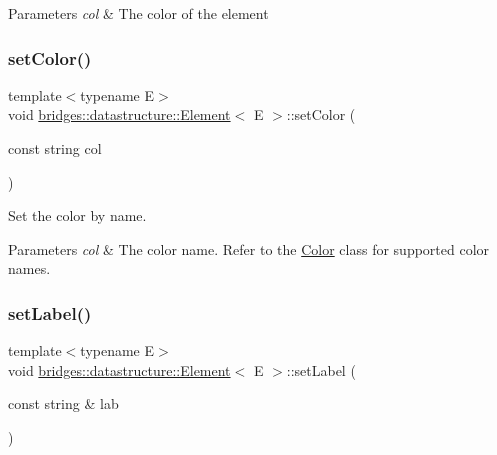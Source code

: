 \begin{DoxyParams}{Parameters}
{\em col} & The color of the element \\
\hline
\end{DoxyParams}
\mbox{\label{classbridges_1_1datastructure_1_1_element_a3792c8d514f4d644d739c6124f26bcbf}} 
\subsubsection{\texorpdfstring{set\+Color()}{setColor()}\hspace{0.1cm}{\footnotesize\ttfamily [2/2]}}
{\footnotesize\ttfamily template$<$typename E$>$ \\
void \hyperlink{classbridges_1_1datastructure_1_1_element}{bridges\+::datastructure\+::\+Element}$<$ E $>$\+::set\+Color (\begin{DoxyParamCaption}\item[{const string}]{col }\end{DoxyParamCaption})\hspace{0.3cm}{\ttfamily [inline]}}



Set the color by name. 


\begin{DoxyParams}{Parameters}
{\em col} & The color name. Refer to the \hyperlink{classbridges_1_1datastructure_1_1_color}{Color} class for supported color names. \\
\hline
\end{DoxyParams}
\mbox{\label{classbridges_1_1datastructure_1_1_element_a3a1fe4e3aa100125710c30f6e401e8c3}} 
\subsubsection{\texorpdfstring{set\+Label()}{setLabel()}}
{\footnotesize\ttfamily template$<$typename E$>$ \\
void \hyperlink{classbridges_1_1datastructure_1_1_element}{bridges\+::datastructure\+::\+Element}$<$ E $>$\+::set\+Label (\begin{DoxyParamCaption}\item[{const string \&}]{lab }\end{DoxyParamCaption})\hspace{0.3cm}{\ttfamily [inline]}}

